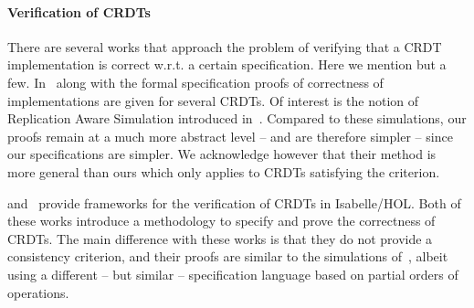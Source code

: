 \paragraph{Verification of CRDTs}
There are several works that approach the problem of verifying that a
CRDT implementation is correct w.r.t. a certain specification.
%
Here we mention but a few.
%
In~\cite{BurckhardtGYZ14, AttiyaBGMYZ16, Burckhardt14} along with the
formal specification proofs of correctness of implementations are
given for several CRDTs.
%
Of interest is the notion of Replication Aware Simulation introduced
in~\cite{BurckhardtGYZ14}.
%
Compared to these simulations, our proofs remain at a much more
abstract level -- and are therefore simpler -- since our
specifications are simpler.
%
We acknowledge however that their method is more general than ours
which only applies to CRDTs satisfying the \CRDTLinshort{} criterion.

\citet{ZellerBP14} and~\citet{GomesKMB17} provide frameworks for the
verification of CRDTs in Isabelle/HOL\@.
%
Both of these works introduce a methodology to specify and prove the
correctness of CRDTs.
%
The main difference with these works is that they do not provide a
consistency criterion, and their proofs are similar to the simulations
of~\cite{BurckhardtGYZ14}, albeit using a different -- but similar
-- specification language based on partial orders of operations.

